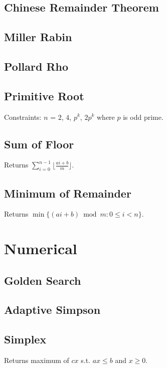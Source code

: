 \documentclass{article}
\begin{document}
\begin{multicols}{2}
    \subsection{Chinese Remainder Theorem}
    
    \subsection{Miller Rabin}
    
    \subsection{Pollard Rho}
    
    \subsection{Primitive Root}
    Constraints: $n$ = $2$, $4$, $p^k$, $2p^{k}$ where $p$ is odd prime.
    
    \subsection{Sum of Floor}
    Returns $\sum_{i=0}^{n-1}\lfloor\frac{ai+b}{m}\rfloor$.
    
    \subsection{Minimum of Remainder}
    Returns $\min\{(ai+b)\bmod m:0\le i<n\}$.
    

    \section{Numerical}
    \subsection{Golden Search}
    
    \subsection{Adaptive Simpson}
    
    \subsection{Simplex}
    Returns maximum of $cx$ s.t. $ax\le b$ and $x\ge 0$.
    
    


\end{multicols}
\end{document}

